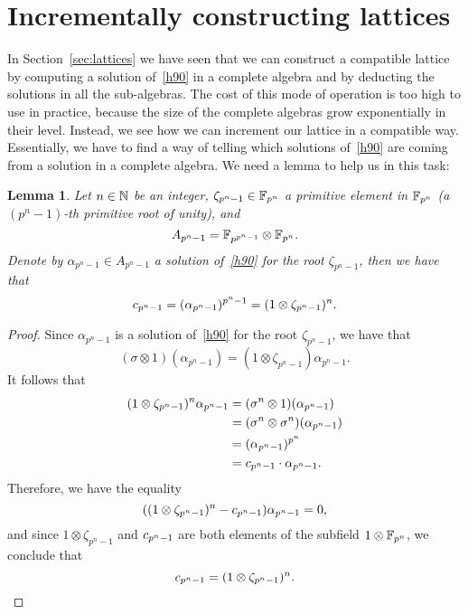 \documentclass{sig-alternate}
\newtheorem{lemma}[theorem]{Lemma}
\begin{document}
\section{Incrementally constructing lattices}
\label{sec:construction}
In Section~\ref{sec:lattices} we have seen that we can construct a compatible
lattice by computing a solution of~\eqref{h90} in a complete algebra and
by deducting the solutions in all the sub-algebras. The cost of this mode of
operation is too high to use in practice, because the size of the complete
algebras grow exponentially in their level. Instead, we see how we can
increment our lattice in a compatible way.
Essentially, we have to find a way of telling which solutions of~\eqref{h90} are
coming from a solution in a complete algebra. We need a lemma to help us in this task:
\begin{lemma}
  \label{lemma:formula}
  Let $n\in\mathbb{N}$ be an integer, $\zeta_{p^n-1}\in\mathbb{F}_{p^n}$ a
  primitive element in $\mathbb{F}_{p^n}$ (a $(p^n-1)$-th primitive root of
  unity), and
  \[
    A_{p^n-1} = \mathbb{F}_{p^{p^n-1}}\otimes\mathbb{F}_{p^n}.
  \]
  Denote by $\alpha_{p^n-1}\in A_{p^{n}-1}$ a solution of~\eqref{h90} for the
  root $\zeta_{p^n-1}$, then we have that
  \[
    c_{p^n-1} = (\alpha_{p^n-1})^{p^n-1} = (1\otimes\zeta_{p^n-1})^n.
  \]
\end{lemma}
\begin{proof}
  Since $\alpha_{p^n-1}$ is a solution of~\eqref{h90} for the root
  $\zeta_{p^n-1}$, we have that
  \[
    (\sigma\otimes 1)(\alpha_{p^n-1}) =
    (1\otimes\zeta_{p^n-1})\alpha_{p^n-1}.
  \]
  It follows that
  \begin{align*}
    (1\otimes\zeta_{p^n-1})^n \alpha_{p^n-1} &= (\sigma^n\otimes1)(\alpha_{p^n-1})\\
    &= (\sigma^n\otimes\sigma^n)(\alpha_{p^n-1})\\
    &= (\alpha_{p^n-1})^{p^n}\\
    &= c_{p^n-1}\cdot\alpha_{p^n-1}.
  \end{align*}
  Therefore, we have the equality
  \[
    ( (1\otimes\zeta_{p^n-1})^n - c_{p^n-1})\alpha_{p^n-1} = 0,
  \]
  and since $1\otimes\zeta_{p^n-1}$ and $c_{p^n-1}$ are both elements of the
  subfield $1\otimes\mathbb{F}_{p^n}$, we conclude that
  \[
    c_{p^n-1} = (1\otimes\zeta_{p^n-1})^n.
  \]
\end{proof}
\end{document}
